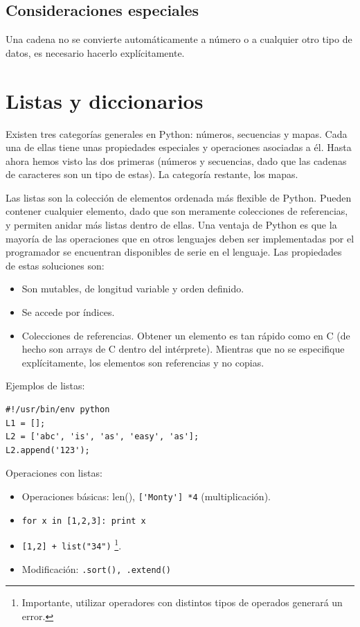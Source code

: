 \documentclass[12pt]{article} %
\begin{document}
\subsection{Consideraciones especiales}
Una cadena no se convierte automáticamente a número o a cualquier otro tipo de datos, es necesario hacerlo explícitamente.

\section{Listas y diccionarios}
Existen tres categorías generales en Python: números, secuencias y mapas. Cada una de ellas tiene unas propiedades especiales y operaciones asociadas a él. Hasta ahora hemos visto las dos primeras (números y secuencias, dado que las cadenas de caracteres son un tipo de estas). La categoría restante, los mapas.

Las listas son la colección de elementos ordenada más flexible de Python. Pueden contener cualquier elemento, dado que son meramente colecciones de referencias, y permiten anidar más listas dentro de ellas.
Una ventaja de Python es que la mayoría de las operaciones que en otros lenguajes deben ser implementadas por el programador se encuentran disponibles de serie en el lenguaje.
Las propiedades de estas soluciones son:
\begin{itemize}
	\item Son mutables, de longitud variable y orden definido.
	\item Se accede por índices.
	\item Colecciones de referencias. Obtener un elemento es tan rápido como en C (de hecho son arrays de C dentro del intérprete). Mientras que no se especifique explícitamente, los elementos son referencias y no copias.
\end{itemize}
Ejemplos de listas:
\begin{lstlisting}[frame=single, showspaces=false]
#!/usr/bin/env python
L1 = [];
L2 = ['abc', 'is', 'as', 'easy', 'as'];
L2.append('123');
\end{lstlisting}
Operaciones con listas:
\begin{itemize}
	\item Operaciones básicas: len(), \verb+['Monty'] *4+ (multiplicación).
	\item \verb+for x in [1,2,3]: print x+
	\item \verb#[1,2] + list("34")# \footnote{Importante, utilizar operadores con distintos tipos de operados generará un error.}.
	\item Modificación: \verb+.sort(), .extend()+
\end{itemize}
\end{document}

